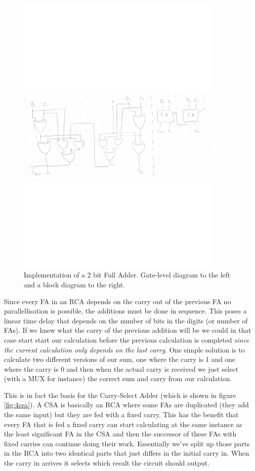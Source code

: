 \documentclass{article}
\begin{document}
\begin{figure}[ht]
  \centering
  \includegraphics[width=10cm]{images/2b-FA.pdf}
  \caption{Implementation of a 2 bit Full Adder. Gate-level diagram to the left and a block diagram to the right.}
  \label{fig:2fa}
\end{figure}

Since every FA in an RCA depends on the carry out of the previous FA
no parallellisation is possible, the additions must be done in
sequence. This poses a linear time delay that depends on the number of
bits in the digits (or number of FAs). If we knew what the carry of
the previous addition will be we could in that case start start our
calculation before the previous calculation is completed {\it since
  the current calculation only depends on the last carry}. One simple
solution is to calculate two different versions of our sum, one where
the carry is 1 and one where the carry is 0 and then when the actual
carry is received we just select (with a MUX for instance) the correct
sum and carry from our calculation.

This is in fact the basis for the Carry-Select Adder (which is shown
in figure \ref{fig:4csa}). A CSA is basically an RCA where some FAs are
duplicated (they add the same input) but they are fed with a fixed
carry. This has the benefit that every FA that is fed a fixed carry
can start calculating at the same instance as the least significant FA
in the CSA and then the successor of these FAs with fixed carries can
continue doing their work. Essentially we've split up those parts in
the RCA into two identical parts that just differs in the initial
carry in. When the carry in arrives it selects which result the
circuit should output.
\end{document}
